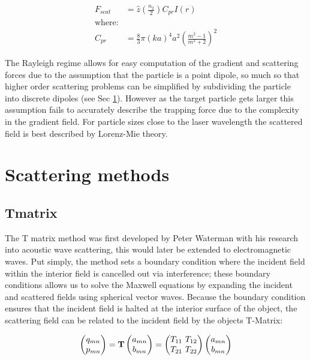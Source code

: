 \documentclass[a4paper,oneside,11pt]{book}
\begin{document}
\begin{align}
	F_{scat} &= \hat{z} \left(\frac{n_2}{2}\right) C_{pr} I(r) \\
	\text{where:} \nonumber \\
	C_{pr} &= \frac{8}{3} \pi (ka)^4 a^2 \left(\frac{m^2-1}{m^2+2}\right)^2
\end{align}

The Rayleigh regime allows for easy computation of the gradient and scattering forces due to the assumption that the particle is a point dipole, so much so that higher order scattering problems can be simplified by subdividing the particle into discrete dipoles (see Sec \ref{sec:scattering}). However as the target particle gets larger this assumption fails to accurately describe the trapping force due to the complexity in the gradient field. For particle sizes close to the laser wavelength the scattered field is best described by Lorenz-Mie theory. 

\section{Scattering methods}
\label{sec:scattering}
\subsection{Tmatrix}
The T matrix method was first developed by Peter Waterman with his 
research into acoustic wave scattering, this would later be extended to 
electromagnetic waves. Put simply, the method sets a boundary condition 
where the incident field within the interior field is cancelled out via 
interference; these boundary conditions allows us to solve the Maxwell 
equations by expanding the incident and scattered fields using spherical 
vector waves. Because the boundary condition ensures that the incident field is halted at the interior surface of the object, the scattering field can be related to the incident field by the objects T-Matrix:

\begin{align}
	\begin{pmatrix}
		q_{mn} \\
		p_{mn} 
	\end{pmatrix}
	= \bold{T} 
	\begin{pmatrix}
		a_{mn} \\
		b_{mn}
	\end{pmatrix}
	= \begin{pmatrix}
		T_{11} \ T_{12} \\
		T_{21} \ T_{22}
	\end{pmatrix}
	\begin{pmatrix}
		a_{mn} \\
		b_{mn}
	\end{pmatrix}
\end{align}
\end{document}
